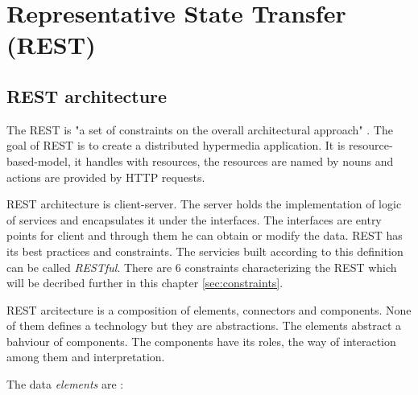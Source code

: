 

\chapter{Representative State Transfer (REST)}
\label{chap:rest}

\section{REST architecture}
\label{sec:rest-architecture}

The REST is "a set of constraints on the overall architectural approach" \cite{agile-architecture}. The goal of REST is to create a distributed hypermedia application. It is \gls{resource-based-model}, it handles with resources, the resources are named by nouns and actions are provided by HTTP requests. 

REST architecture is client-server. The server holds the implementation of logic of services and encapsulates it under the interfaces. The interfaces are entry points for client and through them he can obtain or modify the data.
REST has its best practices and constraints. The servicies built according to this definition can be called \emph{RESTful}. There are 6 constraints characterizing the REST which will be decribed further in this chapter \ref{sec:constraints}.

REST arcitecture is a composition of elements, connectors and components. None of them defines a technology but they are abstractions. The elements abstract a bahviour of components. The components have its roles, the way of interaction among them and interpretation.

The data \emph{elements} are \cite{fielding}: %

